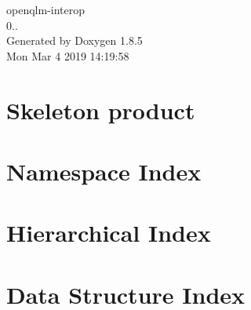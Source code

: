 \documentclass[twoside]{book}
\newcommand{\clearemptydoublepage}{%
  \newpage{\pagestyle{empty}\cleardoublepage}%
}
\begin{document}
\hypersetup{pageanchor=false}
\begin{titlepage}
\vspace*{7cm}
\begin{center}%
{\Large openqlm-\/interop \\[1ex]\large 0.. }\\
\vspace*{1cm}
{\large Generated by Doxygen 1.8.5}\\
\vspace*{0.5cm}
{\small Mon Mar 4 2019 14:19:58}\\
\end{center}
\end{titlepage}
\clearemptydoublepage
\tableofcontents
\clearemptydoublepage
{}
\hypersetup{pageanchor=true}

\chapter{Skeleton product}
\label{index}\hypertarget{index}{}
\chapter{Namespace Index}

\chapter{Hierarchical Index}

\chapter{Data Structure Index}

\end{document}
